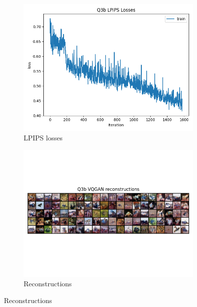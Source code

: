 \documentclass{article}
\begin{document}
\begin{figure}[H]
    \\
    \begin{subfigure}{0.4\textwidth}
        \centering
        \includegraphics[width=\textwidth]{figures/q3b_lpips_losses.png}
        \caption{LPIPS losses}
    \end{subfigure}
    \begin{subfigure}{0.6\textwidth}
        \centering
        \includegraphics[width=\textwidth]{figures/q3b_reconstructions.png}
        \caption{Reconstructions}
    \end{subfigure}
\end{figure}
\end{document}
